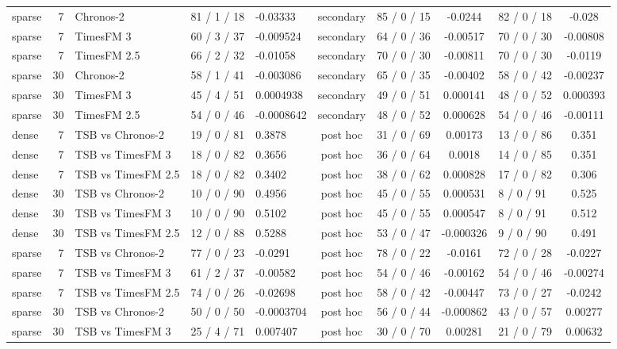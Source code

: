 \begin{table}[p]
\begin{tabular}{lrlclclclc}
sparse & 7 & Chronos-2 & 81 / 1 / 18 & -0.03333 & secondary & 85 / 0 / 15 & -0.0244 & 82 / 0 / 18 & -0.028 \\
sparse & 7 & TimesFM 3 & 60 / 3 / 37 & -0.009524 & secondary & 64 / 0 / 36 & -0.00517 & 70 / 0 / 30 & -0.00808 \\
sparse & 7 & TimesFM 2.5 & 66 / 2 / 32 & -0.01058 & secondary & 70 / 0 / 30 & -0.00811 & 70 / 0 / 30 & -0.0119 \\
sparse & 30 & Chronos-2 & 58 / 1 / 41 & -0.003086 & secondary & 65 / 0 / 35 & -0.00402 & 58 / 0 / 42 & -0.00237 \\
sparse & 30 & TimesFM 3 & 45 / 4 / 51 & 0.0004938 & secondary & 49 / 0 / 51 & 0.000141 & 48 / 0 / 52 & 0.000393 \\
sparse & 30 & TimesFM 2.5 & 54 / 0 / 46 & -0.0008642 & secondary & 48 / 0 / 52 & 0.000628 & 54 / 0 / 46 & -0.00111 \\
dense & 7 & TSB vs Chronos-2 & 19 / 0 / 81 & 0.3878 & post hoc & 31 / 0 / 69 & 0.00173 & 13 / 0 / 86 & 0.351 \\
dense & 7 & TSB vs TimesFM 3 & 18 / 0 / 82 & 0.3656 & post hoc & 36 / 0 / 64 & 0.0018 & 14 / 0 / 85 & 0.351 \\
dense & 7 & TSB vs TimesFM 2.5 & 18 / 0 / 82 & 0.3402 & post hoc & 38 / 0 / 62 & 0.000828 & 17 / 0 / 82 & 0.306 \\
dense & 30 & TSB vs Chronos-2 & 10 / 0 / 90 & 0.4956 & post hoc & 45 / 0 / 55 & 0.000531 & 8 / 0 / 91 & 0.525 \\
dense & 30 & TSB vs TimesFM 3 & 10 / 0 / 90 & 0.5102 & post hoc & 45 / 0 / 55 & 0.000547 & 8 / 0 / 91 & 0.512 \\
dense & 30 & TSB vs TimesFM 2.5 & 12 / 0 / 88 & 0.5288 & post hoc & 53 / 0 / 47 & -0.000326 & 9 / 0 / 90 & 0.491 \\
sparse & 7 & TSB vs Chronos-2 & 77 / 0 / 23 & -0.0291 & post hoc & 78 / 0 / 22 & -0.0161 & 72 / 0 / 28 & -0.0227 \\
sparse & 7 & TSB vs TimesFM 3 & 61 / 2 / 37 & -0.00582 & post hoc & 54 / 0 / 46 & -0.00162 & 54 / 0 / 46 & -0.00274 \\
sparse & 7 & TSB vs TimesFM 2.5 & 74 / 0 / 26 & -0.02698 & post hoc & 58 / 0 / 42 & -0.00447 & 73 / 0 / 27 & -0.0242 \\
sparse & 30 & TSB vs Chronos-2 & 50 / 0 / 50 & -0.0003704 & post hoc & 56 / 0 / 44 & -0.000862 & 43 / 0 / 57 & 0.00277 \\
sparse & 30 & TSB vs TimesFM 3 & 25 / 4 / 71 & 0.007407 & post hoc & 30 / 0 / 70 & 0.00281 & 21 / 0 / 79 & 0.00632 \\

\end{tabular}
\end{table}
